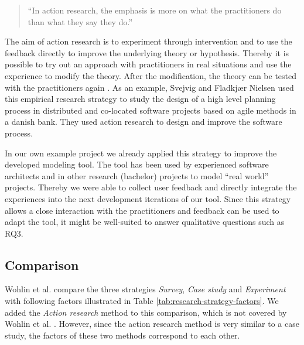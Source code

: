 \documentclass[runningheads]{llncs}
\begin{document}
\begin{quotation}
	``In action research, the emphasis is more on what the practitioners do than what they say they do.'' \cite{Avison:1999:AR:291469.291479}
\end{quotation}

The aim of action research is to experiment through intervention and to use the feedback directly to improve the underlying theory or hypothesis. Thereby it is possible to try out an approach with practitioners in real situations and use the experience to modify the theory. After the modification, the theory can be tested with the practitioners again \cite{Avison:1999:AR:291469.291479}. As an example, Svejvig and Fladkj{\ae}r Nielsen \cite{Svejvig2010} used this empirical research strategy to study the design of a high level planning process in distributed and co-located software projects based on agile methods in a danish bank. They used action research to design and improve the software process.

In our own example project we already applied this strategy to improve the developed modeling tool. The tool has been used by experienced software architects and in other research (bachelor) projects to model ``real world'' projects. Thereby we were able to collect user feedback and directly integrate the experiences into the next development iterations of our tool. Since this strategy allows a close interaction with the practitioners and feedback can be used to adapt the tool, it might be well-suited to answer qualitative questions such as RQ3.

\subsection{Comparison}
Wohlin et al. \cite{Wohlin:2012:ESE:2349018} compare the three strategies \textit{Survey}, \textit{Case study} and \textit{Experiment} with following factors illustrated in Table \ref{tab:research-strategy-factors}. We added the \textit{Action research} method to this comparison, which is not covered by Wohlin et al. \cite{Wohlin:2012:ESE:2349018}. However, since the action research method is very similar to a case study, the factors of these two methods correspond to each other. 
\end{document}
